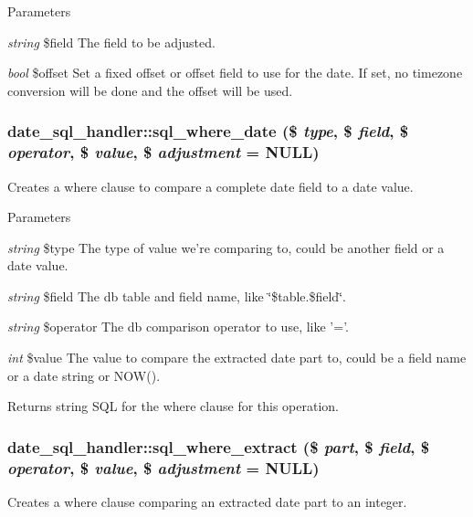 \begin{DoxyParams}{Parameters}
\item[{\em string}]\$field The field to be adjusted. \item[{\em bool}]\$offset Set a fixed offset or offset field to use for the date. If set, no timezone conversion will be done and the offset will be used. \end{DoxyParams}
\hypertarget{classdate__sql__handler_ac3532976b8e7c016775e71cf873dfffe}{
\subsubsection[{sql\_\-where\_\-date}]{\setlength{\rightskip}{0pt plus 5cm}date\_\-sql\_\-handler::sql\_\-where\_\-date (\$ {\em type}, \/  \$ {\em field}, \/  \$ {\em operator}, \/  \$ {\em value}, \/  \$ {\em adjustment} = {\ttfamily NULL})}}
\label{classdate__sql__handler_ac3532976b8e7c016775e71cf873dfffe}
Creates a where clause to compare a complete date field to a date value.


\begin{DoxyParams}{Parameters}
\item[{\em string}]\$type The type of value we're comparing to, could be another field or a date value. \item[{\em string}]\$field The db table and field name, like \char`\"{}\$table.\$field\char`\"{}. \item[{\em string}]\$operator The db comparison operator to use, like '='. \item[{\em int}]\$value The value to compare the extracted date part to, could be a field name or a date string or NOW().\end{DoxyParams}
\begin{DoxyReturn}{Returns}
string SQL for the where clause for this operation. 
\end{DoxyReturn}
\hypertarget{classdate__sql__handler_a2e88fbe05ec50038f3df0d63a9548623}{
\subsubsection[{sql\_\-where\_\-extract}]{\setlength{\rightskip}{0pt plus 5cm}date\_\-sql\_\-handler::sql\_\-where\_\-extract (\$ {\em part}, \/  \$ {\em field}, \/  \$ {\em operator}, \/  \$ {\em value}, \/  \$ {\em adjustment} = {\ttfamily NULL})}}
\label{classdate__sql__handler_a2e88fbe05ec50038f3df0d63a9548623}
Creates a where clause comparing an extracted date part to an integer.


